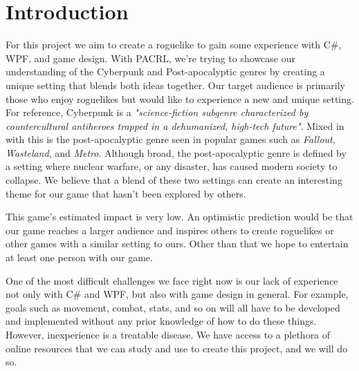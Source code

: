 \documentclass[10pt,conference,onecolumn,compsoc]{IEEEtran}
\begin{document}
\IEEEdisplaynontitleabstractindextext
\IEEEpeerreviewmaketitle



\section{Introduction}

For this project we aim to create a roguelike to gain some experience with C\#, WPF, and game design. With PACRL, we're trying to showcase our understanding of the Cyberpunk and Post-apocalyptic genres by creating a unique setting that blends both ideas together. Our target audience is primarily those who enjoy roguelikes but would like to experience a new  and unique setting. For reference, Cyberpunk is a \emph{"science-fiction subgenre characterized by countercultural antiheroes trapped in a dehumanized, high-tech future"}\cite{IEEEhowto:cyberpunk}. Mixed in with this is the post-apocalyptic genre seen in popular games such as \emph{Fallout}, \emph{Wasteland}, and \emph{Metro}. Although broad, the post-apocalyptic genre is defined by a setting where nuclear warfare, or any disaster, has caused modern society to collapse. We believe that a blend of these two settings can create an interesting theme for our game that hasn't been explored by others.

This game's estimated impact is very low. An optimistic prediction would be that our game reaches a larger audience and inspires others to create roguelikes or other games with a similar setting to ours. Other than that we hope to entertain at least one person with our game.

One of the most difficult challenges we face right now is our lack of experience not only with C\# and WPF, but also with game design in general. For example, goals such as movement, combat, stats, and so on will all have to be developed and implemented without any prior knowledge of how to do these things. However, inexperience is a treatable disease. We have access to a plethora of online resources that we can study and use to create this project, and we will do so. 

\end{document}
